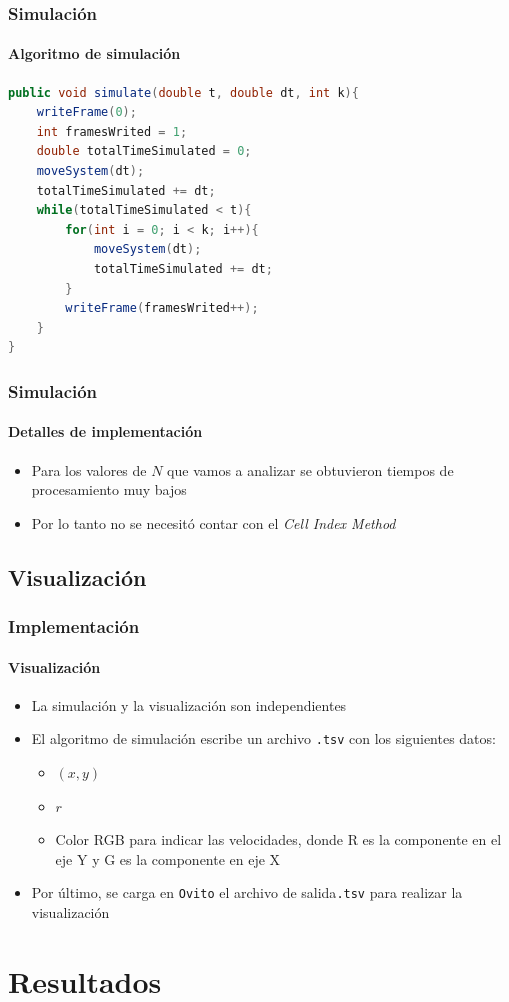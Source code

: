 \documentclass[hyperref={pdfpagelayout=SinglePage}]{beamer}
\begin{document}
\begin{frame}[fragile]
\frametitle{Simulación}
\framesubtitle{Algoritmo de simulación}
\begin{lstlisting}[language=Java, caption = Algoritmo de simulación]
public void simulate(double t, double dt, int k){
	writeFrame(0);
	int framesWrited = 1;
	double totalTimeSimulated = 0;
	moveSystem(dt);
	totalTimeSimulated += dt;
	while(totalTimeSimulated < t){
		for(int i = 0; i < k; i++){
			moveSystem(dt);
			totalTimeSimulated += dt;
		}
		writeFrame(framesWrited++);
	}
}
\end{lstlisting}
\end{frame}

\begin{frame}
\frametitle{Simulación}
\framesubtitle{Detalles de implementación}
\begin{itemize}
	\item Para los valores de $N$ que vamos a analizar se obtuvieron tiempos de procesamiento muy bajos
	\item Por lo tanto no se necesitó contar con el \textit{Cell Index Method}
\end{itemize}
\end{frame}

\subsection{Visualización}

\begin{frame}
\frametitle{Implementación}
\framesubtitle{Visualización}
\begin{itemize}
	\item La simulación y la visualización son independientes
	\item El algoritmo de simulación escribe un archivo \texttt{.tsv} con los siguientes datos:
	\begin{itemize}
		\item $(x,y)$
		\item $r$
		\item Color RGB para indicar las velocidades, donde R es la componente en el eje Y y G es la componente en eje X
	\end{itemize}
	\item Por último, se carga en \texttt{Ovito} el archivo de salida\texttt{.tsv} para realizar la visualización
\end{itemize}
\end{frame}

\section{Resultados}
\end{document}
